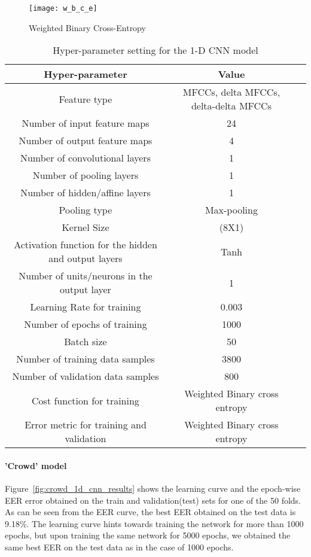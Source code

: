 \begin{figure}[!hb] 
\centering 
\texttt{[image: w\_b\_c\_e]} 
\caption[Weighted Binary Cross-Entropy]{Weighted Binary Cross-Entropy}
\label{fig:w_b_c_e} 
\end{figure}

\begin{table}[tb]
\caption[1-D CNN Hyper-parameters DB2]{Hyper-parameter setting for the 1-D CNN model}
\label{tab:1d_cnn_hyper_db2}
\centering
\begin{tabular}{ccc}
\toprule
Hyper-parameter & Value \\ 
\midrule
Feature type	& MFCCs, delta MFCCs, delta-delta MFCCs \\
Number of input feature maps	& 24 \\
Number of output feature maps	& 4 \\
Number of convolutional layers	& 1 \\
Number of pooling layers	& 1 \\
Number of hidden/affine layers	& 1 \\
Pooling type	& Max-pooling \\
Kernel Size	& (8X1) \\
Activation function for the hidden and output layers & Tanh\\
Number of units/neurons in the output layer	& 1 \\
Learning Rate for training	& 0.003 \\
Number of epochs of training	& 1000 \\
Batch size	& 50 \\
Number of training data samples	& 3800 \\
Number of validation data samples & 800 \\
Cost function for training	& Weighted Binary cross entropy \\
Error metric for training and validation	& Weighted Binary cross entropy\\
\bottomrule 
\end{tabular}
\end{table}



\paragraph{'Crowd' model}
Figure~\ref{fig:crowd_1d_cnn_results} shows the learning curve and the epoch-wise EER error obtained on the train and validation(test) sets for one of the 50 folds. As can be seen from the EER curve, the best EER obtained on the test data is 9.18\%. The learning curve hints towards training the network for more than 1000 epochs, but upon training the same network for 5000 epochs, we obtained the same best EER on the test data as in the case of 1000 epochs.

